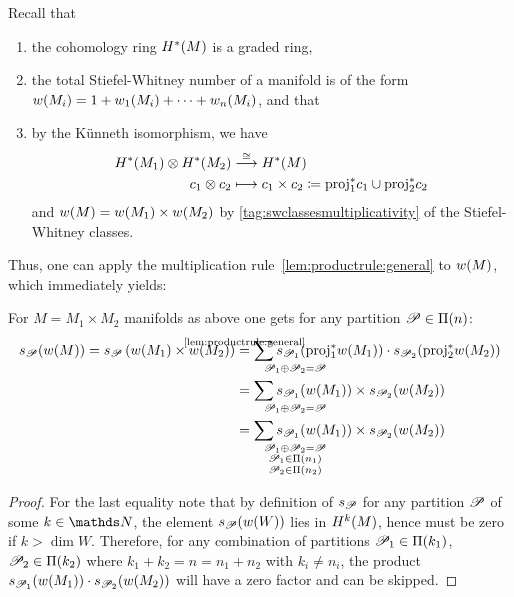 Recall that
\begin{enumerate}
\item the cohomology ring $H^*(M)$ is a graded ring,
\item the total Stiefel-Whitney number of a manifold is of the form
  ${w}(M_i) = 1 + {w_{1}}(M_i) + \dotsb + {w_{n}}(M_i)$, and that
\item by the Künneth isomorphism, we have
  \begin{align*}
    H^*(M_1)\otimes H^*(M_2)
    &\overset{\cong}{\longrightarrow} H^*(M)
    \\
    c_1 \otimes c_2
    &\longmapsto c_1\times c_2
      \coloneqq {\mathrm{proj}}^*_1 c_1 \cup {\mathrm{proj}}^*_2 c_2
  \end{align*}
  and ${w}(M) = {w}(M_1) \times {w}(M_2)$ by
  \ref{tag:swclassesmultiplicativity} of the Stiefel-Whitney classes.
\end{enumerate}
Thus, one can apply the multiplication
rule~\ref{lem:productrule:general} to ${w}(M)$, which immediately
yields:
\begin{Cor}\label{cor:productrule:swcl}
  For $M=M_1\times M_2$ manifolds as above one gets for any partition
  $\mathscr{P}\in\Pi({n})$:
  \begin{align*}
    \s{\Part}(\W{M})
    =
    \s{\Part}\left(\W{M_1}\times \W{M_2}\right)
    &\cequalsby{\ref{lem:productrule:general}}
      \sum_{\mathrlap{\Part_1\concat\Part_2=\Part}}
      \s{\Part_1}(\pb\proj_1\W{M_1}) \cdot \s{\Part_2}(\pb\proj_2\W{M_2})
    \\
    &=
      \sum_{\mathrlap{\Part_1\concat\Part_2=\Part}}
      \s{\Part_1}(\W{M_1}) \times \s{\Part_2}(\W{M_2})
    \\ &=
         \sum_{\mathrlap{\substack{
         \Part_1\concat\Part_2=\Part\\
    \Part_1\in\PartitionsOf{n_1}\\
    \Part_2\in\PartitionsOf{n_2}\\
    }}}
    \s{\Part_1}(\W{M_1}) \times \s{\Part_2}(\W{M_2})
  \end{align*}
  \begin{proof}
    For the last equality note that by definition of $s_{\mathscr{P}}$
    for any partition $\mathscr{P}$ of some $k\in\Nat$, 
    the element $s_{\mathscr{P}}({w}(W))$ lies in $H^k(M)$,
    hence must be zero if $k>\dim W$.
    Therefore, for any combination of partitions
    $\mathscr{P}_1\in\Pi({k_1})$,
    $\mathscr{P}_2\in\Pi({k_2})$
    where $k_1+k_2=n=n_1+n_2$ with $k_i\neq n_i$, the product
    $s_{\mathscr{P}_1}({w}(M_1))\cdot s_{\mathscr{P}_2}({w}(M_2))$ will have a zero
    factor and can be skipped.
  \end{proof}
\end{Cor}

